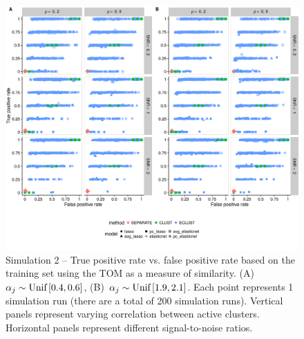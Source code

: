 \begin{figure}
	\includegraphics[scale=0.57, keepaspectratio]{./figs/hydra/results/figures/sim2-sept8/tpr_fpr_TOM_sim2.png}
	\caption{Simulation 2 -- True positive rate vs. false positive rate based on the training set using the TOM as a measure of similarity. \mbox{(A) $\alpha_{j} \sim \textrm{{Unif}}\left[0.4, 0.6\right]$}, \mbox{(B) $\alpha_{j} \sim \textrm{{Unif}}\left[1.9, 2.1\right]$}. Each point represents 1 simulation run (there are a total of 200 simulation runs). Vertical panels represent varying correlation between active clusters. Horizontal panels represent different signal-to-noise ratios.}
	\label{fig:tpr_fpr_TOM_sim2}
\end{figure}



